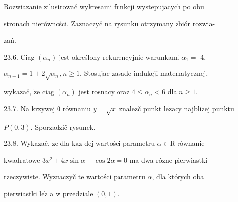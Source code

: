 \documentclass[a4paper,12pt]{article}
\begin{document}
Rozwiazanie zilustrowač wykresami funkcji wystepujacych po obu

stronach nierówności. Zaznaczyč na rysunku otrzymany zbiór rozwia-

zań.

23.6. Ciag $(\alpha_{n})$ jest określony rekurencyjnie warunkami $\alpha_{1} =$ 4,

$\alpha_{n+1} = 1+2\sqrt{\alpha_{n}}, n \geq 1$. Stosujac zasade indukcji matematycznej,

wykazač, $\dot{\mathrm{z}}\mathrm{e}$ ciag $(\alpha_{n})$ jest rosnacy oraz $4\leq\alpha_{n}<6$ dla $n\geq 1.$

23.7. Na krzywej $0$ równaniu $y=\sqrt{x}$ znalez$\acute{}$č punkt $\mathrm{l}\mathrm{e}\dot{\mathrm{z}}\mathrm{a}\mathrm{c}\mathrm{y}$ najblizej punktu

$P(0,3)$. Sporzadzič rysunek.

23.8. Wykazač, $\dot{\mathrm{z}}\mathrm{e}$ dla $\mathrm{k}\mathrm{a}\dot{\mathrm{z}}$ dej wartości parametru $\alpha \in \mathrm{R}$ równanie

kwadratowe $3x^{2}+4x\sin\alpha-\cos 2\alpha=0$ ma dwa rózne pierwiastki

rzeczywiste. Wyznaczyč te wartości parametru $\alpha$, dla których oba

pierwiastki $\mathrm{l}\mathrm{e}\dot{\mathrm{z}}$ a $\mathrm{w}$ przedziale $(0,1).$
\end{document}
